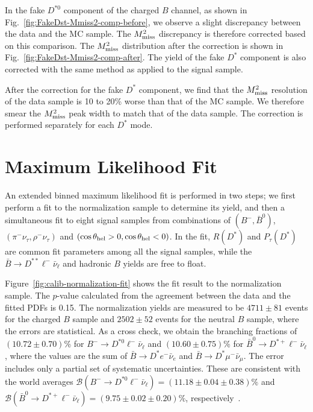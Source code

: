 \documentclass[aps,prd,twocolumn,superscriptaddress,showpacs,preprintnumbers,amsmath,amssymb]{revtex4-1}
\begin{document}
In the fake $D^{*0}$ component of the charged $B$ channel, as shown in Fig.~\ref{fig:FakeDst-Mmiss2-comp-before}, we observe a slight discrepancy between the data and the MC sample. The $M_{\rm miss}^2$ discrepancy is therefore corrected based on this comparison. The $M_{\rm miss}^2$ distribution after the correction is shown in Fig.~\ref{fig:FakeDst-Mmiss2-comp-after}. The yield of the fake $D^*$ component is also corrected with the same method as applied to the signal sample.

After the correction for the fake $D^*$ component, we find that the $M_{\rm miss}^2$ resolution of the data sample is 10 to 20\% worse than that of the MC sample. We therefore smear the $M_{\rm miss}^2$ peak width to match that of the data sample. The correction is performed separately for each $D^*$ mode.

\section{Maximum Likelihood Fit}

An extended binned maximum likelihood fit is performed in two steps; we first perform a fit to the normalization sample to determine its yield, and then a simultaneous fit to eight signal samples from combinations of $(B^-, \bar{B}^0)$, $(\pi^- \nu_\tau, \rho^- \nu_\tau)$ and $(\cos\theta_{\rm hel} > 0, \cos\theta_{\rm hel} < 0)$. In the fit, $R(D^*)$ and $P_\tau(D^*)$ are common fit parameters among all the signal samples, while the $\bar{B} \rightarrow D^{**} \ell^- \bar{\nu}_\ell$ and hadronic $B$ yields are free to float.

Figure~\ref{fig:calib-normalization-fit} shows the fit result to the normalization sample. The $p$-value calculated from the agreement between the data and the fitted PDFs is 0.15. The normalization yields are measured to be $4711 \pm 81$ events for the charged $B$ sample and $2502 \pm 52$ events for the neutral $B$ sample, where the errors are statistical. As a cross check, we obtain the branching fractions of $(10.72 \pm 0.70)$\% for $B^- \rightarrow D^{*0} \ell^- \bar{\nu}_\ell$ and $(10.60 \pm 0.75)$\% for $\bar{B}^0 \rightarrow D^{*+} \ell^- \bar{\nu}_\ell$, where the values are the sum of $\bar{B} \rightarrow D^* e^- \bar{\nu}_e$ and $\bar{B} \rightarrow D^* \mu^- \bar{\nu}_\mu$. The error includes only a partial set of systematic uncertainties. These are consistent with the world averages $\mathcal{B}(B^- \rightarrow D^{*0} \ell^- \bar{\nu}_\ell) = (11.18 \pm 0.04 \pm 0.38)\%$ and $\mathcal{B}(\bar{B}^0 \rightarrow D^{*+} \ell^- \bar{\nu}_\ell) = (9.75 \pm 0.02 \pm 0.20)\%$, respectively~\cite{cite:HFLAV:2016}.
\end{document}
